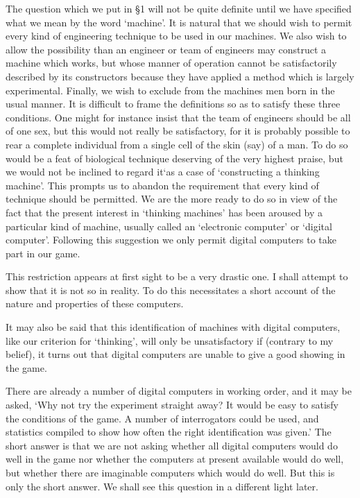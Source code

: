 \documentclass[10pt]{article} %
\begin{document}
The question which we put in \S 1 will not be quite definite until we have specified what we mean by the word `machine'. It is natural that we should wish to permit every kind of engineering technique to be used in our machines. We also wish to allow the possibility than an engineer or team of engineers may construct a machine which works, but whose manner of operation cannot be satisfactorily described by its constructors because they have applied a method which is largely experimental. Finally, we wish to exclude from the machines men born in the usual manner. It is difficult to frame the definitions so as to satisfy these three conditions. One might for instance insist that the team of engineers should be all of one sex, but this would not really be satisfactory, for it is probably possible to rear a complete individual from a single cell of the skin (say) of a man. To do so would be a feat of biological technique deserving of the very highest praise, but we would not be inclined to regard it`as a case of `constructing a thinking machine'. This prompts us to abandon the requirement that every kind of technique should be permitted. We are the more ready to do so in view of the fact that the present interest in `thinking machines' has been aroused by a particular kind of machine, usually called an `electronic computer' or `digital computer'. Following this suggestion we only permit digital computers to take part in our game.

This restriction appears at first sight to be a very drastic one. I shall attempt to show that it is not so in reality. To do this necessitates a short account of the nature and properties of these computers.

It may also be said that this identification of machines with digital computers, like our criterion for `thinking', will only be unsatisfactory if (contrary to my belief), it turns out that digital computers are unable to give a good showing in the game.

There are already a number of digital computers in working order, and it may be asked, `Why not try the experiment straight away? It would be easy to satisfy the conditions of the game. A number of interrogators could be used, and statistics compiled to show how often the right identification was given.' The short answer is that we are not asking whether all digital computers would do well in the game nor whether the computers at present available would do well, but whether there are imaginable computers which would do well. But this is only the short answer. We shall see this question in a different light later.
\end{document}
